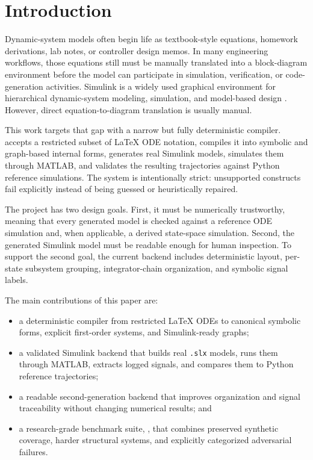 \documentclass[colorlinks,upint,subscriptcorrection,varvw,balance,nofoot]{asmeconf}
\newcommand{\EqnToSim}{\NoCaseChange{Eqn2Sim}}
\begin{document}
\begin{nomenclature}
\end{nomenclature}

\section{Introduction}
Dynamic-system models often begin life as textbook-style equations, homework derivations, lab notes, or controller design memos. In many engineering workflows, those equations still must be manually translated into a block-diagram environment before the model can participate in simulation, verification, or code-generation activities. Simulink is a widely used graphical environment for hierarchical dynamic-system modeling, simulation, and model-based design \cite{mathworks2025simulink}. However, direct equation-to-diagram translation is usually manual.

This work targets that gap with a narrow but fully deterministic compiler. \EqnToSim{} accepts a restricted subset of \LaTeX{} ODE notation, compiles it into symbolic and graph-based internal forms, generates real Simulink models, simulates them through MATLAB, and validates the resulting trajectories against Python reference simulations. The system is intentionally strict: unsupported constructs fail explicitly instead of being guessed or heuristically repaired.

The project has two design goals. First, it must be numerically trustworthy, meaning that every generated model is checked against a reference ODE simulation and, when applicable, a derived state-space simulation. Second, the generated Simulink model must be readable enough for human inspection. To support the second goal, the current backend includes deterministic layout, per-state subsystem grouping, integrator-chain organization, and symbolic signal labels.

The main contributions of this paper are:
\begin{itemize}[leftmargin=*,nosep]
\item a deterministic compiler from restricted \LaTeX{} ODEs to canonical symbolic forms, explicit first-order systems, and Simulink-ready graphs;
\item a validated Simulink backend that builds real \texttt{.slx} models, runs them through MATLAB, extracts logged signals, and compares them to Python reference trajectories;
\item a readable second-generation backend that improves organization and signal traceability without changing numerical results; and
\item a research-grade benchmark suite, , that combines preserved synthetic coverage, harder structural systems, and explicitly categorized adversarial failures.
\end{itemize}
\end{document}
